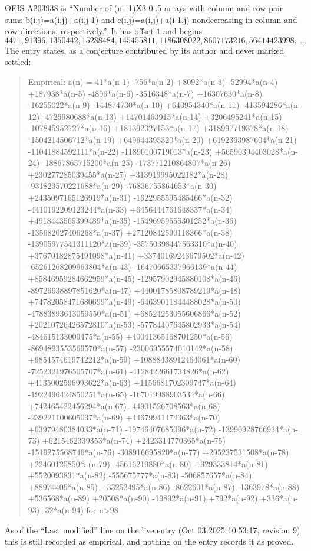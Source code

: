 \documentclass[11pt,a4paper]{article}
\theoremstyle{plain}
\theoremstyle{definition}
\begin{document}
OEIS A203938 is ``Number of (n+1)X3 0..5 arrays with column and row pair sums b(i,j)=a(i,j)+a(i,j-1) and c(i,j)=a(i,j)+a(i-1,j) nondecreasing in column and row directions, respectively.''. It has offset $1$ and begins
\[
4471, 91396, 1350442, 15288484, 145455811, 1186308022, 8607173216, 56414423998,\ \dots
\]
The entry states, as a conjecture contributed by its author and never marked settled:
\begin{quote}
Empirical: a(n) = 41*a(n-1) -756*a(n-2) +8092*a(n-3) -52994*a(n-4) +187938*a(n-5) -4896*a(n-6) -3516348*a(n-7) +16307630*a(n-8) -16255022*a(n-9) -144874730*a(n-10) +643954340*a(n-11) -413594286*a(n-12) -4725980688*a(n-13) +14701463915*a(n-14) +3206495241*a(n-15) -107845952727*a(n-16) +181392027153*a(n-17) +318997719378*a(n-18) -1504214506712*a(n-19) +649644395320*a(n-20) +6192363987604*a(n-21) -11041884592111*a(n-22) -11890100719013*a(n-23) +56590394403028*a(n-24) -18867865715200*a(n-25) -173771210864807*a(n-26) +230277285039455*a(n-27) +313919995022182*a(n-28) -931823570221688*a(n-29) -76836755864653*a(n-30) +2435097165126919*a(n-31) -1622955595485466*a(n-32) -4410192209123244*a(n-33) +6456444761648337*a(n-34) +4918443565399489*a(n-35) -15496959555301252*a(n-36) -135682027406268*a(n-37) +27120842590118366*a(n-38) -13905977541311120*a(n-39) -35750398447563310*a(n-40) +37670182875491098*a(n-41) +33740169243679502*a(n-42) -65261268209963804*a(n-43) -16470665337966139*a(n-44) +85846959284662959*a(n-45) -12957902945880108*a(n-46) -89729638897851620*a(n-47) +44001785808789219*a(n-48) +74782058471680699*a(n-49) -64639011844488028*a(n-50) -47883893613059550*a(n-51) +68524253055606866*a(n-52) +20210726426572810*a(n-53) -57784407645802933*a(n-54) -484615133009475*a(n-55) +40041365168701250*a(n-56) -8694893553569570*a(n-57) -23006955574010142*a(n-58) +9854574619742212*a(n-59) +10888438912464061*a(n-60) -7252321976505707*a(n-61) -4128422661734826*a(n-62) +4135002596993622*a(n-63) +1156681702309747*a(n-64) -1922496424850251*a(n-65) -167019988903534*a(n-66) +742465422456294*a(n-67) -44901526708563*a(n-68) -239221100605037*a(n-69) +44679941474363*a(n-70) +63979480384033*a(n-71) -19746407685096*a(n-72) -13990928766934*a(n-73) +6215462339353*a(n-74) +2423314770365*a(n-75) -1519275568746*a(n-76) -308916695820*a(n-77) +295237531508*a(n-78) +22460125850*a(n-79) -45616219880*a(n-80) +929333814*a(n-81) +5520093831*a(n-82) -555675777*a(n-83) -506857657*a(n-84) +88974409*a(n-85) +33252495*a(n-86) -8622601*a(n-87) -1363978*a(n-88) +536568*a(n-89) +20508*a(n-90) -19892*a(n-91) +792*a(n-92) +336*a(n-93) -32*a(n-94) for n>98
\end{quote}
As of the ``Last modified'' line on the live entry (Oct 03 2025 10:53:17, revision 9) this is still
recorded as empirical, and nothing on the entry records it as proved.
\end{document}
